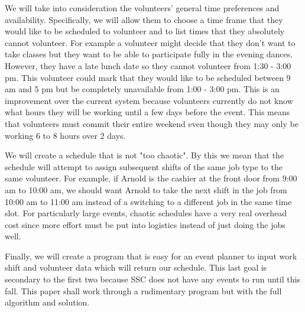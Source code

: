 \documentclass[11pt]{article}
\theoremstyle{definition}
\begin{document}
\begin{multicols}{2}
We will take into consideration the volunteers' general time preferences and availability.
Specifically, we will allow them to choose a time frame that they would like to be scheduled to volunteer and to list times that they absolutely cannot volunteer.
For example a volunteer might decide that they don't want to take classes but they want to be able to participate fully in the evening dances. However, they have a late lunch date so they cannot volunteer from 1:30 - 3:00 pm.
This volunteer could mark that they would like to be scheduled between 9 am and 5 pm but be completely unavailable from 1:00 - 3:00 pm.
This is an improvement over the current system because volunteers currently do not know what hours they will be working until a few days before the event.
This means that volunteers must commit their entire weekend even though they may only be working 6 to 8 hours over 2 days.

We will create a schedule that is not "too chaotic".
By this we mean that the schedule will attempt to assign subsequent shifts of the same job type to the same volunteer.
For example, if Arnold is the cashier at the front door from 9:00 am to 10:00 am, we should want Arnold to take the next shift in the job from 10:00 am to 11:00 am instead of a switching to a different job in the same time slot.
For particularly large events, chaotic schedules have a very real overhead cost since more effort must be put into logistics instead of just doing the jobs well.

Finally, we will create a program that is easy for an event planner to input work shift and volunteer data which will return our schedule.
This last goal is secondary to the first two because SSC does not have any events to run until this fall.
This paper shall work through a rudimentary program but with the full algorithm and solution.


%
%

\end{multicols}
\end{document}
